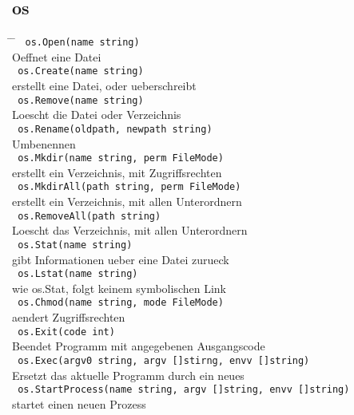 \documentclass[twoside,a4paper,12pt]{article}
\begin{document}
\subsection{os}
\begin{tabbing}
 \hspace{2mm} \= \hspace{50mm} \= \kill
 \> \verb| os.Open(name string) | \\ 
 \> Oeffnet eine Datei \\ 
 \> \verb| os.Create(name string) | \\ 
 \> erstellt eine Datei, oder ueberschreibt \\ 
 \> \verb| os.Remove(name string) |  \\
 \> Loescht die Datei oder Verzeichnis \\
 \> \verb| os.Rename(oldpath, newpath string) | \\ 
 \> Umbenennen \\ 
 \> \verb| os.Mkdir(name string, perm FileMode) | \\ 
 \> erstellt ein Verzeichnis, mit Zugriffsrechten \\
 \> \verb| os.MkdirAll(path string, perm FileMode) |  \\ 
 \> erstellt ein Verzeichnis, mit allen Unterordnern \\ 
 \> \verb| os.RemoveAll(path string) | \\ 
 \> Loescht das Verzeichnis, mit allen Unterordnern \\
 \> \verb| os.Stat(name string) | \\ 
 \> gibt Informationen ueber eine Datei zurueck \\ 
 \> \verb| os.Lstat(name string) | \\ 
 \> wie os.Stat, folgt keinem symbolischen Link \\ 
 \> \verb| os.Chmod(name string, mode FileMode) | \\ 
 \> aendert Zugriffsrechten \\
 \> \verb| os.Exit(code int) | \\ 
 \> Beendet Programm mit angegebenen Ausgangscode \\ 
 \> \verb| os.Exec(argv0 string, argv []stirng, envv []string) | \\ 
 \> \> Ersetzt das aktuelle Programm durch ein neues \\ 
 \> \verb| os.StartProcess(name string, argv []string, envv []string) | \\ 
 \> \> startet einen neuen Prozess \\ 

\end{tabbing}
\end{document}
